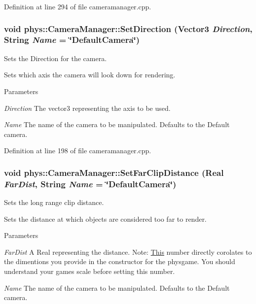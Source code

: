 Definition at line 294 of file cameramanager.cpp.

\hypertarget{classphys_1_1CameraManager_aaee96e189230c020d6f7b6fe439e0812}{
\subsubsection[{SetDirection}]{\setlength{\rightskip}{0pt plus 5cm}void phys::CameraManager::SetDirection ({\bf Vector3} {\em Direction}, \/  {\bf String} {\em Name} = {\ttfamily \char`\"{}DefaultCamera\char`\"{}})}}
\label{d9/d91/classphys_1_1CameraManager_aaee96e189230c020d6f7b6fe439e0812}


Sets the Direction for the camera. 

Sets which axis the camera will look down for rendering. 
\begin{DoxyParams}{Parameters}
\item[{\em Direction}]The vector3 representing the axis to be used. \item[{\em Name}]The name of the camera to be manipulated. Defaults to the Default camera. \end{DoxyParams}


Definition at line 198 of file cameramanager.cpp.

\hypertarget{classphys_1_1CameraManager_a809e4e31a9ad42afd620e95508ad78d7}{
\subsubsection[{SetFarClipDistance}]{\setlength{\rightskip}{0pt plus 5cm}void phys::CameraManager::SetFarClipDistance ({\bf Real} {\em FarDist}, \/  {\bf String} {\em Name} = {\ttfamily \char`\"{}DefaultCamera\char`\"{}})}}
\label{d9/d91/classphys_1_1CameraManager_a809e4e31a9ad42afd620e95508ad78d7}


Sets the long range clip distance. 

Sets the distance at which objects are considered too far to render. 
\begin{DoxyParams}{Parameters}
\item[{\em FarDist}]A Real representing the distance. Note: \hyperlink{structThis}{This} number directly corolates to the dimentions you provide in the constructor for the physgame. You should understand your games scale before setting this number. \item[{\em Name}]The name of the camera to be manipulated. Defaults to the Default camera. \end{DoxyParams}


